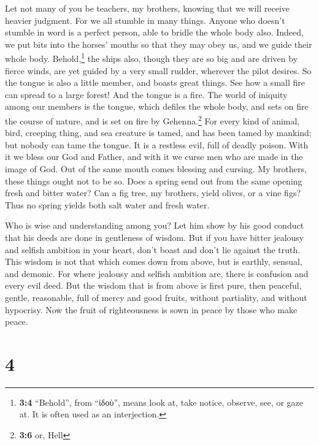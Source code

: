 Let not many of you be teachers, my brothers, knowing
that we will receive heavier judgment.  For we all stumble
in many things. Anyone who doesn't stumble in word is a perfect person,
able to bridle the whole body also.  Indeed, we put bits
into the horses' mouths so that they may obey us, and we guide their
whole body.  Behold,\footnote{\textbf{3:4} ``Behold'',
  from ``ἰδοὺ'', means look at, take notice, observe, see, or gaze at.
  It is often used as an interjection.} the ships also, though they are
so big and are driven by fierce winds, are yet guided by a very small
rudder, wherever the pilot desires.  So the tongue is also
a little member, and boasts great things. See how a small fire can
spread to a large forest!  And the tongue is a fire. The
world of iniquity among our members is the tongue, which defiles the
whole body, and sets on fire the course of nature, and is set on fire by
Gehenna.\footnote{\textbf{3:6} or, Hell}  For every kind
of animal, bird, creeping thing, and sea creature is tamed, and has been
tamed by mankind;  but nobody can tame the tongue. It is a
restless evil, full of deadly poison.  With it we bless
our God and Father, and with it we curse men who are made in the image
of God.  Out of the same mouth comes blessing and
cursing. My brothers, these things ought not to be so. 
Does a spring send out from the same opening fresh and bitter water?
 Can a fig tree, my brothers, yield olives, or a vine
figs? Thus no spring yields both salt water and fresh water.

 Who is wise and understanding among you? Let him show by
his good conduct that his deeds are done in gentleness of wisdom.
 But if you have bitter jealousy and selfish ambition in
your heart, don't boast and don't lie against the truth. 
This wisdom is not that which comes down from above, but is earthly,
sensual, and demonic.  For where jealousy and selfish
ambition are, there is confusion and every evil deed. 
But the wisdom that is from above is first pure, then peaceful, gentle,
reasonable, full of mercy and good fruits, without partiality, and
without hypocrisy.  Now the fruit of righteousness is
sown in peace by those who make peace.

\hypertarget{section-3}{%
\section{4}\label{section-3}}

